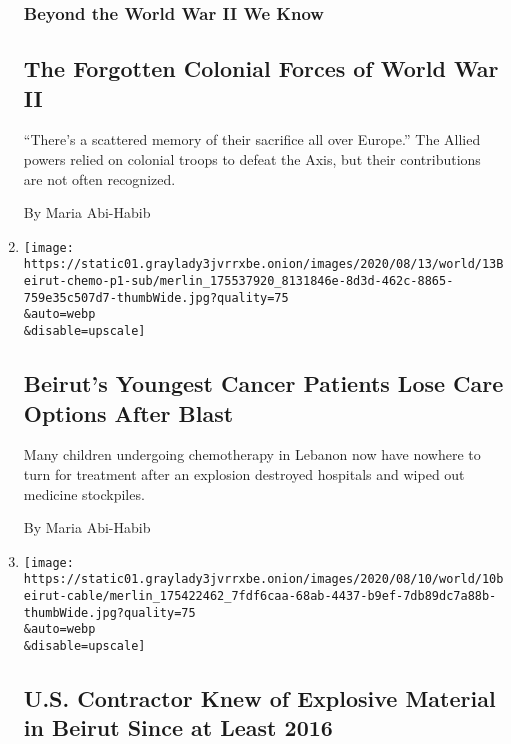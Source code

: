 \begin{enumerate}
{  \subsubsection{Beyond the World War II We
  Know}\label{beyond-the-world-war-ii-we-know}}

  \hypertarget{the-forgotten-colonial-forces-of-world-war-ii}{%
  \subsection{The Forgotten Colonial Forces of World War
  II}\label{the-forgotten-colonial-forces-of-world-war-ii}}

  ``There's a scattered memory of their sacrifice all over Europe.'' The
  Allied powers relied on colonial troops to defeat the Axis, but their
  contributions are not often recognized.

  By Maria Abi-Habib
\item
  \href{/2020/08/12/world/middleeast/beirut-cancer-chemotherapy.html}{}

  \texttt{[image: https://static01.graylady3jvrrxbe.onion/images/2020/08/13/world/13Beirut-chemo-p1-sub/merlin\_175537920\_8131846e-8d3d-462c-8865-759e35c507d7-thumbWide.jpg?quality=75\\\&auto=webp\\\&disable=upscale]}

  \hypertarget{beiruts-youngest-cancer-patients-lose-care-options-after-blast}{%
  \subsection{Beirut's Youngest Cancer Patients Lose Care Options After
  Blast}\label{beiruts-youngest-cancer-patients-lose-care-options-after-blast}}

  Many children undergoing chemotherapy in Lebanon now have nowhere to
  turn for treatment after an explosion destroyed hospitals and wiped
  out medicine stockpiles.

  By Maria Abi-Habib
\item
  \href{/2020/08/10/world/middleeast/beirut-explosion-us-contractor.html}{}

  \texttt{[image: https://static01.graylady3jvrrxbe.onion/images/2020/08/10/world/10beirut-cable/merlin\_175422462\_7fdf6caa-68ab-4437-b9ef-7db89dc7a88b-thumbWide.jpg?quality=75\\\&auto=webp\\\&disable=upscale]}

  \hypertarget{us-contractor-knew-of-explosive-material-in-beirut-since-at-least-2016}{%
  \subsection{U.S. Contractor Knew of Explosive Material in Beirut Since
  at Least
  2016}\label{us-contractor-knew-of-explosive-material-in-beirut-since-at-least-2016}}


\end{enumerate}
